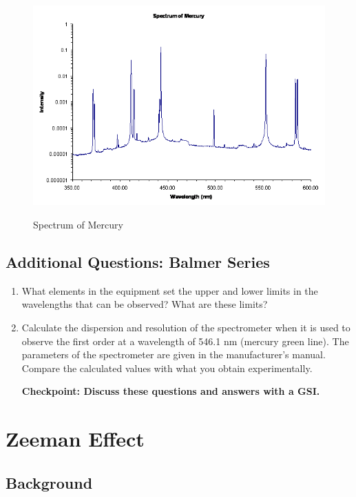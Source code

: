 \documentclass{../lab}
\begin{document}
\begin{figure}[h]
    \centering
    \href{http://experimentationlab.berkeley.edu/sites/default/files/images/Atmimage015.gif}{\includegraphics[width=0.8\linewidth]{images/Atmimage015.png}}
    \caption{Spectrum of Mercury}
    \label{fig:Atmimage015}
\end{figure}

\subsection{Additional Questions: Balmer Series}

\begin{enumerate}
    \item What elements in the equipment set the upper and lower limits in the wavelengths that can be observed? What are these limits?

    \item Calculate the dispersion and resolution of the spectrometer when it is used to observe the first order at a wavelength of 546.1 nm (mercury green line). The parameters of the spectrometer are given in the manufacturer's manual. Compare the calculated values with what you obtain experimentally.
    
    \textbf{Checkpoint: Discuss these questions and answers with a GSI.}

\end{enumerate}

\section{Zeeman Effect}

\subsection{Background}
\end{document}
